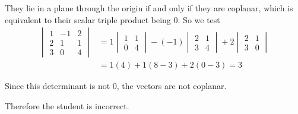 \documentclass[leqno]{article}
\begin{document}
\begin{enumerate}[
  label=\textbf{\arabic*.},
  leftmargin=*,
  topsep=0pt,
  partopsep=0pt,
  parsep=0pt
]
\begin{djsSolution}
\begin{enumerate}[label=\textbf{(\alph*)}]
They lie in a plane through the origin if and only if they are coplanar, which is equivalent to their scalar triple product being \(0\). So we test
\begin{align*}
\begin{vmatrix}
1 & -1 & 2\\
2 & 1 & 1\\
3 & 0 & 4
\end{vmatrix}
&=1\begin{vmatrix}1&1\\0&4\end{vmatrix}
-(-1)\begin{vmatrix}2&1\\3&4\end{vmatrix}
+2\begin{vmatrix}2&1\\3&0\end{vmatrix}\\
&=1(4)+1(8-3)+2(0-3) = 3
\end{align*}

Since this determinant is not \(0\), the vectors are not coplanar.

Therefore the student is incorrect.
\end{enumerate}
\end{djsSolution}


\newpage

\questionitem


\end{enumerate}
\end{document}
